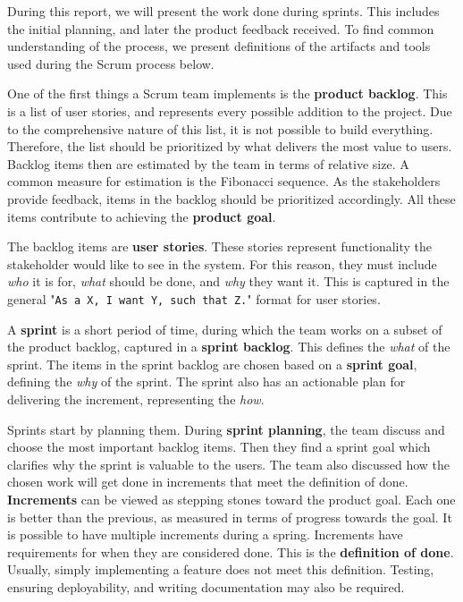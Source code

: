 During this report, we will present the work done during sprints. This includes the initial planning, and later the product feedback received.
To find common understanding of the process, we present definitions of the artifacts and tools used during the Scrum process below.

One of the first things a Scrum team implements is the \textbf{product backlog}. This is a list of user stories, and represents every possible addition to the project. Due to the comprehensive nature of this list, it is not possible to build everything. Therefore, the list should be prioritized by what delivers the most value to users.
Backlog items then are estimated by the team in terms of relative size. A common measure for estimation is the Fibonacci sequence.
As the stakeholders provide feedback, items in the backlog should be prioritized accordingly. All these items contribute to achieving the \textbf{product goal}.

The backlog items are \textbf{user stories}. These stories represent functionality the stakeholder would like to see in the system. For this reason, they must include \textit{who} it is for, \textit{what} should be done, and \textit{why} they want it. This is captured in the general "\texttt{As a X, I want Y, such that Z.}" format for user stories.

A \textbf{sprint} is a short period of time, during which the team works on a subset of the product backlog, captured in a \textbf{sprint backlog}. This defines the \textit{what} of the sprint. The items in the sprint backlog are chosen based on a \textbf{sprint goal}, defining the \textit{why} of the sprint. The sprint also has an actionable plan for delivering the increment, representing the \textit{how}.

Sprints start by planning them. During \textbf{sprint planning}, the team discuss and choose the most important backlog items. Then they find a sprint goal which clarifies why the sprint is valuable to the users. The team also discussed how the chosen work will get done in increments that meet the definition of done. \textbf{Increments} can be viewed as stepping stones toward the product goal. Each one is better than the previous, as measured in terms of progress towards the goal. It is possible to have multiple increments during a spring. Increments have requirements for when they are considered done. This is the \textbf{definition of done}. Usually, simply implementing a feature does not meet this definition. Testing, ensuring deployability, and writing documentation may also be required.

